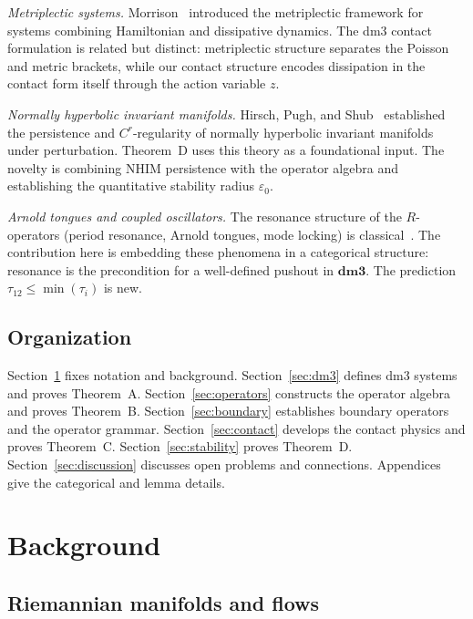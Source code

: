 \documentclass[12pt, oneside]{book}
\theoremstyle{plain}
\theoremstyle{definition}
\theoremstyle{remark}
\newcommand{\dmcat}{\mathbf{dm3}}
\begin{document}
\emph{Metriplectic systems.}
Morrison~\cite{Morrison1986} introduced the metriplectic framework for
systems combining Hamiltonian and dissipative dynamics. The dm3 contact
formulation is related but distinct: metriplectic structure separates the
Poisson and metric brackets, while our contact structure encodes dissipation
in the contact form itself through the action variable $z$.

\emph{Normally hyperbolic invariant manifolds.}
Hirsch, Pugh, and Shub~\cite{HPS} established the persistence and
$C^r$-regularity of normally hyperbolic invariant manifolds under
perturbation. Theorem~D uses this theory as a foundational input.
The novelty is combining NHIM persistence with the operator algebra
and establishing the quantitative stability radius $\varepsilon_0$.

\emph{Arnold tongues and coupled oscillators.}
The resonance structure of the $R$-operators (period resonance, Arnold
tongues, mode locking) is classical~\cite{Arnold,Pikovsky}. The contribution
here is embedding these phenomena in a categorical structure: resonance is
the precondition for a well-defined pushout in $\dmcat$. The prediction
$\tau_{12}\le\min(\tau_i)$ is new.

\subsection{Organization}

Section~\ref{sec:background} fixes notation and background.
Section~\ref{sec:dm3} defines dm3 systems and proves Theorem~A.
Section~\ref{sec:operators} constructs the operator algebra and proves
Theorem~B.
Section~\ref{sec:boundary} establishes boundary operators and the
operator grammar.
Section~\ref{sec:contact} develops the contact physics and proves
Theorem~C.
Section~\ref{sec:stability} proves Theorem~D.
Section~\ref{sec:discussion} discusses open problems and connections.
Appendices give the categorical and lemma details.

\section{Background}\label{sec:background}

\subsection{Riemannian manifolds and flows}
\end{document}
